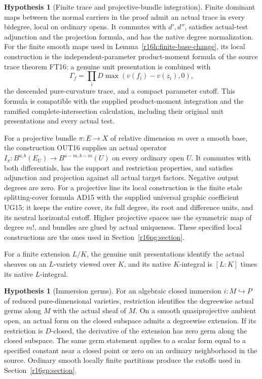 \documentclass[11pt,a4paper]{article}
\theoremstyle{definition}
\newtheorem{hypothesis}[theorem]{Hypothesis}
\theoremstyle{remark}
\numberwithin{equation}{section}
\begin{document}
\begin{hypothesis}[Finite trace and projective-bundle integration]\label{hyp:height-trace}
Finite dominant maps between the normal carriers in the proof admit an actual trace in every bidegree, local on ordinary opens. It commutes with $d',d''$, satisfies actual-test adjunction and the projection formula, and has the native degree normalization. For the finite smooth maps used in Lemma~\ref{r16h:finite-base-change}, its local construction is the independent-parameter product-moment formula of the source trace theorem FT16: a genuine unit presentation is combined with
\[
 \Gamma_f=\prod_iD\max(v(f_i)-v(z_i),0),
\]
the descended pure-curvature trace, and a compact parameter cutoff. This formula is compatible with the supplied product-moment integration and the ramified complete-intersection calculation, including their original unit presentations and every actual test.

For a projective bundle $\pi:E\to X$ of relative dimension $m$ over a smooth base, the construction OUT16 supplies an actual operator
$I_\pi:B^{a,b}(E_U)\to B^{a-m,b-m}(U)$ on every ordinary open $U$. It commutes with both differentials, has the support and restriction properties, and satisfies adjunction and projection against all actual target factors. Negative output degrees are zero. For a projective line its local construction is the finite etale splitting-cover formula AD15 with the supplied universal graphic coefficient UG15; it keeps the entire cover, its full degree, its root and difference units, and its neutral horizontal cutoff. Higher projective spaces use the symmetric map of degree $m!$, and bundles are glued by actual uniqueness. These specified local constructions are the ones used in Section~\ref{r16pg:section}.

For a finite extension $L/K$, the genuine unit presentations identify the actual sheaves on an $L$-variety viewed over $K$, and its native $K$-integral is $[L:K]$ times its native $L$-integral.
\end{hypothesis}

\begin{hypothesis}[Immersion germs]\label{hyp:height-immersion}
For an algebraic closed immersion $i:M\hookrightarrow P$ of reduced pure-dimensional varieties, restriction identifies the degreewise actual germs along $M$ with the actual sheaf of $M$. On a smooth quasiprojective ambient open, an actual form on the closed subspace admits a degreewise extension. If its restriction is $D$-closed, the derivative of the extension has zero germ along the closed subspace. The same germ statement applies to a scalar form equal to a specified constant near a closed point or zero on an ordinary neighborhood in the source. Ordinary smooth locally finite partitions produce the cutoffs used in Section~\ref{r16gp:section}.
\end{hypothesis}
\end{document}
